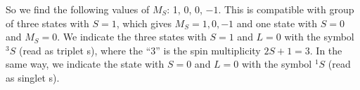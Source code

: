 \documentclass[../Main/chem331-notes.tex]{subfiles}
\begin{document}
%

So we find the following values of $M_S$: 1, 0, 0, $-1$. This is compatible with group of three states with $S =1$, which gives $M_S = 1, 0, -1$ and one state with $S = 0$ and $M_S = 0$.
We indicate the three states with $S =1$ and $L = 0$ with the symbol $^{3}S$ (read as triplet s), where the ``3'' is the spin multiplicity $2S +1 = 3$. In the same way, we indicate the state with $S =0$ and $L = 0$ with the symbol $^{1}S$ (read as singlet s).
\end{document}
